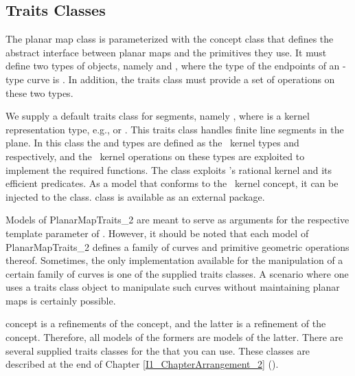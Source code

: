 \subsection{Traits Classes}
The planar map class is parameterized with the concept class
 that defines the abstract interface
between planar maps and the primitives they use. It must define two
types of objects, namely  and
, where the type of the endpoints of an
-type curve is . In
addition, the traits class must provide a set of operations on these
two types.
					  
We supply a default traits class for segments, namely
, where  is a
kernel representation type, e.g.,  or
. This traits class handles finite line segments in
the plane. In this class the
 and  types are
defined as the \cgal\ kernel types
 and 
respectively, and the \cgal\ kernel operations on these types are
exploited to implement the required functions.
The  class exploits \leda 's rational
kernel and its efficient predicates. As a model that conforms to the
\cgal\ kernel concept, it can be injected to the
 class.
 class is available as an external
package.

Models of PlanarMapTraits\_2 are meant to serve as arguments for the
respective template parameter of
. However, it should be noted
that each model of PlanarMapTraits\_2 defines a family of curves and
primitive geometric operations thereof. Sometimes, the only
implementation available for the manipulation of a certain family of
curves is one of the supplied traits classes. A scenario where one
uses a traits class object to manipulate such curves without
maintaining planar maps is certainly possible.

 concept is a refinements of the
 concept, and the latter is a
refinement of the  concept.
Therefore, all models of the formers are models of the latter. 
There are several supplied traits classes for the 
that you can use. These classes are described at the end of Chapter
\ref{I1_ChapterArrangement_2} ().


